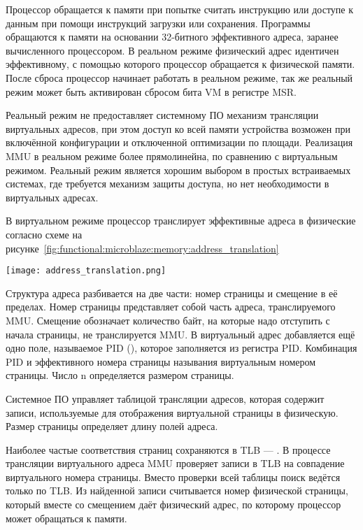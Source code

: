 Процессор обращается к памяти при попытке считать инструкцию или доступе к
данным при помощи инструкций загрузки или сохранения. Программы обращаются к
памяти на основании 32-битного эффективного адреса, заранее вычисленного процессором.
В реальном режиме физический адрес идентичен эффективному, с помощью которого
процессор обращается к физической памяти. После сброса процессор начинает работать
в реальном режиме, так же реальный режим может быть активирован сбросом бита
VM в регистре MSR.

Реальный режим не предоставляет системному ПО механизм трансляции виртуальных адресов,
при этом доступ ко всей памяти устройства возможен при включённой конфигурации 
и отключенной оптимизации по площади. Реализация MMU в реальном режиме более прямолинейна, по
сравнению с виртуальным режимом. Реальный режим является хорошим выбором в простых встраиваемых
системах, где требуется механизм защиты доступа, но нет необходимости в виртуальных адресах.

В виртуальном режиме процессор транслирует эффективные адреса в физические согласно схеме
на рисунке~\ref{fig:functional:microblaze:memory:address_translation}

\begin{center}
  \centering
  \texttt{[image: address\_translation.png]}
  \label{fig:functional:microblaze:memory:address_translation}
\end{center}

Структура адреса разбивается на две части: номер страницы и смещение в её пределах.
Номер страницы представляет собой часть адреса, транслируемого MMU. Смещение
обозначает количество байт, на которые надо отступить с начала страницы, не
транслируется MMU. В виртуальный адрес добавляется ещё одно поле, называемое
PID (), которое заполняется из регистра PID. Комбинация
PID и эффективного номера страницы называния виртуальным номером страницы.
Число n определяется размером страницы.

Системное ПО управляет таблицой трансляции адресов, которая содержит
записи, используемые для отображения виртуальной страницы в физическую. Размер страницы
определяет длину полей адреса.

Наиболее частые соответствия страниц сохраняются в TLB --- .
В процессе трансляции виртуального адреса MMU проверяет записи в TLB на совпадение
виртуального номера страницы. Вместо проверки всей таблицы поиск ведётся только по TLB.
Из найденной записи считывается номер физической страницы, который вместе со смещением
даёт физический адрес, по которому процессор может обращаться к памяти.

